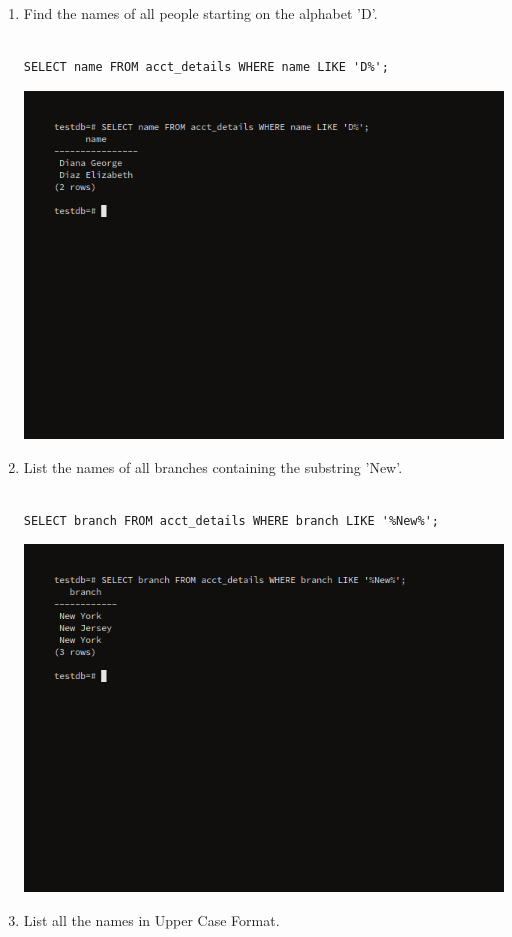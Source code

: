 \begin{enumerate}
\item Find the names of all people starting on the alphabet 'D'.\newline
\begin{verbatim}

SELECT name FROM acct_details WHERE name LIKE 'D%';

\end{verbatim}
\newline
\includegraphics[width=\linewidth]{../Images/Strings/2.png}
\item List the names of all branches containing the substring 'New'.\newline
\begin{verbatim}

SELECT branch FROM acct_details WHERE branch LIKE '%New%';

\end{verbatim}
\newline
\includegraphics[width=\linewidth]{../Images/Strings/3.png}
\item List all the names in Upper Case Format.\newline
\begin{verbatim}


\end{verbatim}
\end{enumerate}
